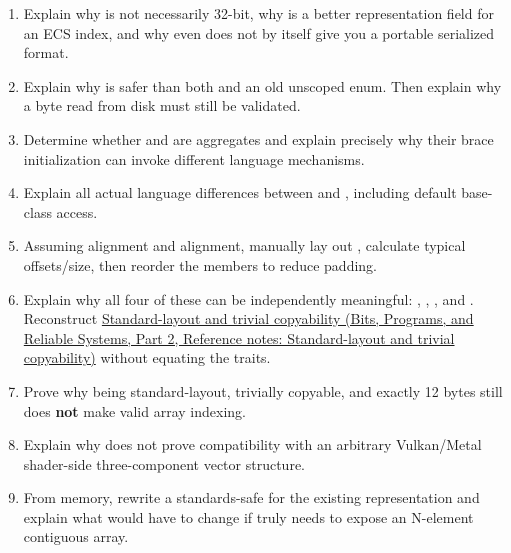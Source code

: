 \begin{enumerate}
\item
  Explain why  is not necessarily 32-bit, why  is a better representation field for an ECS index, and why even  does not by itself give you a portable serialized format.
\item
  Explain why  is safer than both  and an old unscoped enum. Then explain why a byte read from disk must still be validated.
\item
  Determine whether  and  are aggregates and explain precisely why their brace initialization can invoke different language mechanisms.
\item
  Explain all actual language differences between  and , including default base-class access.
\item
  Assuming  alignment and  alignment, manually lay out , calculate typical offsets/size, then reorder the members to reduce padding.
\item
  Explain why all four of these can be independently meaningful: , , , and . Reconstruct \href{../01-Bits-Programs-and-Reliable-Systems-P02/main.pdf\#nameddest=appendix-958870a64c53}{Standard-layout and trivial copyability (Bits, Programs, and Reliable Systems, Part 2, Reference notes: Standard-layout and trivial copyability)} without equating the traits.
\item
  Prove why  being standard-layout, trivially copyable, and exactly 12 bytes still does \textbf{not} make  valid array indexing.
\item
  Explain why  does not prove compatibility with an arbitrary Vulkan/Metal shader-side three-component vector structure.
\item
  From memory, rewrite a standards-safe  for the existing  representation and explain what would have to change if  truly needs to expose an N-element contiguous array.
\end{enumerate}

